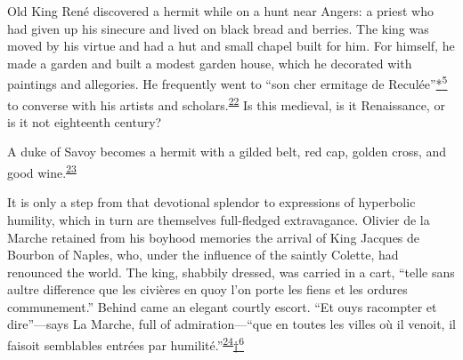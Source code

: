 Old King René discovered a hermit while on a hunt near Angers: a priest
who had given up his sinecure and lived on black bread and berries. The
king was moved by his virtue and had a hut and small chapel built for
him. For himself, he made a garden and built a modest garden house,
which he decorated with paintings and allegories. He frequently went to
``son cher ermitage de
Reculée''\protect\hypertarget{14_Chapter_Seven__THE_PIOUS_PERSONA.xhtmlux5cux23id_2549}{\protect\hyperlink{23_NOTES.xhtmlux5cux23id_2550}{*\textsuperscript{5}}}
to converse with his artists and
scholars.\textsuperscript{\protect\hypertarget{14_Chapter_Seven__THE_PIOUS_PERSONA.xhtmlux5cux23id_980}{\protect\hyperlink{23_NOTES.xhtmlux5cux23id_981}{22}}}
Is this medieval, is it Renaissance, or is it not eighteenth century?

A duke of Savoy becomes a hermit with a gilded belt, red cap, golden
cross, and good
wine.\textsuperscript{\protect\hypertarget{14_Chapter_Seven__THE_PIOUS_PERSONA.xhtmlux5cux23id_978}{\protect\hyperlink{23_NOTES.xhtmlux5cux23id_979}{23}}}

It is only a step from that devotional splendor to expressions of
hyperbolic humility, which in turn are themselves full-fledged
extravagance. Olivier de la Marche retained from his boyhood memories
the arrival of King Jacques de Bourbon of Naples, who, under the
influence of the saintly Colette, had renounced the world. The king,
shabbily dressed, was carried in a cart, ``telle sans aultre difference
que les civières en quoy l'on porte les fiens et les ordures
communement.'' Behind came an elegant courtly escort. ``Et ouys
racompter et dire''---says La Marche, full of admiration---``que en
toutes les villes où il venoit, il faisoit semblables entrées par
humilité.''\textsuperscript{\protect\hypertarget{14_Chapter_Seven__THE_PIOUS_PERSONA.xhtmlux5cux23id_976}{\protect\hyperlink{23_NOTES.xhtmlux5cux23id_977}{24}}}\protect\hypertarget{14_Chapter_Seven__THE_PIOUS_PERSONA.xhtmlux5cux23id_2551}{\protect\hyperlink{23_NOTES.xhtmlux5cux23id_2552}{†\textsuperscript{6}}}

